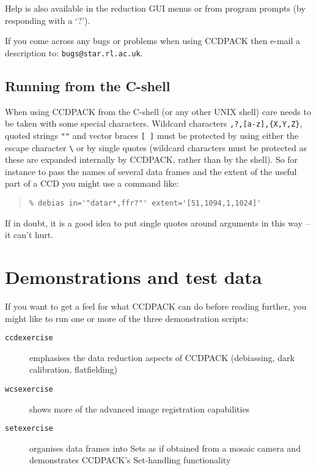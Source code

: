 \documentclass[twoside,11pt]{article}
\newcommand{\xlabel}[1]{}
\renewcommand{\_}{\texttt{\symbol{95}}}
\newenvironment{myquote}{\begin{quote}\begin{small}}{\end{small}\end{quote}}
\newcommand{\text}[1]{{\small \tt #1}}
\begin{document}
Help is also available in the reduction GUI menus or from program
prompts (by responding with a `?').

If you come across any bugs or problems when using CCDPACK then e-mail
a description to: \texttt{bugs@star.rl.ac.uk}.

\subsection{Running from the C-shell}
When using CCDPACK from the C-shell (or any other UNIX shell) care needs to
be taken with some special characters.
Wildcard characters \text{*,?,[a-z],\{X,Y,Z\}}, quoted strings \text{""}
and vector braces \text{[ ]} must be protected by using either the
escape character {\small \verb+\+} or by single quotes (wildcard characters
must be protected as these are expanded internally by CCDPACK, rather than by
the shell).
So for instance to pass the names of several data frames and the extent
of the useful part of a CCD you might use a command like:
\begin{myquote}
\begin{verbatim}
% debias in='"datar*,ffr?"' extent='[51,1094,1,1024]'
\end{verbatim}
\end{myquote}
If in doubt, it is a good idea to put single quotes around arguments 
in this way -- it can't hurt.

\section{\xlabel{demos}\label{demos}Demonstrations and test data}

If you want to get a feel for what CCDPACK can do before reading 
further, you might like to run one or more of the three 
demonstration scripts:
\begin{description}
\item[{\tt ccdexercise}]
emphasises the data reduction aspects of CCDPACK (debiassing,
dark calibration, flatfielding)
\item[{\tt wcsexercise}]
shows more of the advanced image registration capabilities
\item[{\tt setexercise}]
organises data frames into Sets as if obtained from a mosaic camera
and demonstrates CCDPACK's Set-handling functionality
\end{description}
\end{document}
